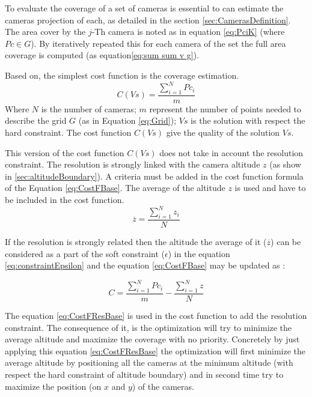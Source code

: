 To evaluate the coverage of a set of cameras is essential to can estimate the cameras projection of each, as detailed in the section \ref{sec:CamerasDefinition}. The area cover by the $j$-Th camera is noted as in equation \ref{eq:PciK} (where $Pc\in G$). By iteratively repeated this for each camera of the set the full area coverage is computed (as equation\ref{eq:sum sum v g}). 

Based on, the  simplest cost function is the coverage estimation.
\begin{equation}\label{eq:CostFBase}
C(Vs) =  \frac{\sum_{i=1}^N{Pc_i} }{m}   
\end{equation}
Where $N$ is the number of cameras; 
$m$ represent the number of points needed to describe the grid $G$ (as in Equation \ref{eq:Grid}); $Vs$ is the solution with respect the hard constraint.
The cost function $C(Vs)$ give the quality of the solution $Vs$.

This version of the cost function $C(Vs)$ does not take in account the resolution constraint. The resolution is  strongly linked with the camera altitude $z$ (as show in \ref{sec:altitudeBoundary}).
 A criteria must be added in the cost function formula of the Equation \ref{eq:CostFBase}. The average of the altitude $z$ is used and have to be included in the cost function.
 \begin{equation}\label{eq:CostFResolutionPart1}
\overline{z}= \frac{\sum_{i=1}^N z_i}{N}     
\end{equation}

 If the resolution is strongly related then the altitude the average of it ($\overline{z}$) can be considered as a part of the soft constraint ($\epsilon$)  in the equation \ref{eq:constraintEpsilon} and the equation \ref{eq:CostFBase} may be updated as : 
 
 \begin{equation}\label{eq:CostFResBase}
C =  \frac{\sum_{i=1}^N {Pc_i}}{m}  - \frac{\sum_{i=1}^N z}{N}     
\end{equation}
 
The equation \ref{eq:CostFResBase} is used in the cost function to add the resolution constraint. The consequence of it, is the optimization will try to minimize the average altitude and maximize the coverage with no priority. Concretely by just applying this equation  \ref{eq:CostFResBase} the optimization will first minimize the average altitude by positioning all the cameras at the minimum altitude (with respect the hard constraint of altitude boundary) and in second time try to maximize the position (on $x$ and $y$) of the cameras. 

